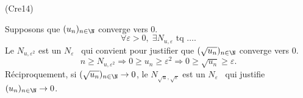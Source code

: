 \begin{tiny}(Cre14)\end{tiny} Supposons que $(u_n)_{n \in \N}$ converge vers $0$.
\[
  \forall \varepsilon >0, \; \exists N_{u, \varepsilon} \text{ tq } \dots .
\]
Le $N_{u, \varepsilon^2}$ est un \og $N_\varepsilon$\fg~ qui convient pour justifier que $(\sqrt{u_n})_{n \in \N}$ converge vers $0$.
\[
  n \geq N_{u, \varepsilon^2}
  \Rightarrow
  0 \geq u_n \geq \varepsilon^2
  \Rightarrow
  0 \geq \sqrt{u_n} \geq \varepsilon.
\]
Réciproquement, si $(\sqrt{u_n})_{n \in \N} \rightarrow 0$, le $N_{\sqrt{u}, \sqrt{\varepsilon}}$ est un \og $N_\varepsilon$\fg~ qui justifie $(u_n)_{n \in \N}\rightarrow 0$.
